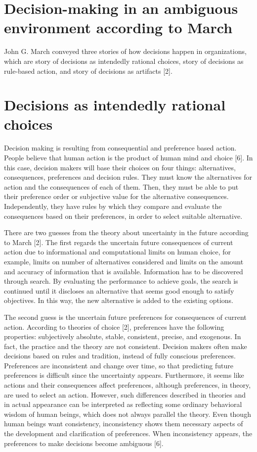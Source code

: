 \section{Decision-making in an ambiguous environment according to March}

John G. March conveyed three stories of how decisions happen in organizations, which are story of decisions as intendedly rational choices, story of decisions as rule-based action, and story of decisions as artifacts [2].

\section{Decisions as intendedly rational choices}

Decision making is resulting from consequential and preference based action. People believe that human action is the product of human mind and choice [6]. In this case, decision makers will base their choices on four things: alternatives, consequences, preferences and decision rules. They must know the alternatives for action and the consequences of each of them. Then, they must be able to put their preference order or subjective value for the alternative consequences. Independently, they have rules by which they compare and evaluate the consequences based on their preferences, in order to select suitable alternative.

There are two guesses from the theory about uncertainty in the future according to March [2]. The first regards the uncertain future consequences of current action due to informational and computational limits on human choice, for example, limits on number of alternatives considered and limits on the amount and accuracy of information that is available. Information has to be discovered through search. By evaluating the performance to achieve goals, the search is continued until it discloses an alternative that seems good enough to satisfy objectives. In this way, the new alternative is added to the existing options.

The second guess is the uncertain future preferences for consequences of current action. According to theories of choice [2], preferences have the following properties: subjectively absolute, stable, consistent, precise, and exogenous. In fact, the practice and the theory are not consistent. Decision makers often make decisions based on rules and tradition, instead of fully conscious preferences. Preferences are inconsistent and change over time, so that predicting future preferences is difficult since the uncertainty appears. Furthermore, it seems like actions and their consequences affect preferences, although preferences, in theory, are used to select an action. However, such differences described in theories and in actual appearance can be interpreted as reflecting some ordinary behavioral wisdom of human beings, which does not always parallel the theory. Even though human beings want consistency, inconsistency shows them necessary aspects of the development and clarification of preferences. When inconsistency appears, the preferences to make decisions become ambiguous [6].

